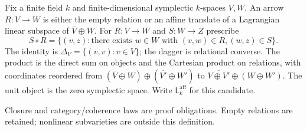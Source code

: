 \begin{definition}
Fix a finite field $k$ and finite-dimensional symplectic $k$-spaces $V,W$.
An arrow $R:V\to W$ is either the empty relation or an affine translate
of a Lagrangian linear subspace of $\overline V\oplus W$.
For $R:V\to W$ and $S:W\to Z$ prescribe
\[
 S\circ R=\{(v,z):\text{there exists }w\in W\text{ with }(v,w)\in R,
 (w,z)\in S\}.
\]
The identity is $\Delta_V=\{(v,v):v\in V\}$; the dagger is relational
converse. The product is the direct sum on objects and the Cartesian
product on relations, with coordinates reordered from
$(\overline V\oplus W)\oplus(\overline {V'}\oplus W')$ to
$\overline{V\oplus V'}\oplus(W\oplus W')$. The unit object is the zero
symplectic space. Write $\mathsf L_k^{\mathrm{aff}}$ for this candidate.
\end{definition}
\begin{scope}
Closure and category/coherence laws are proof obligations. Empty relations are retained; nonlinear subvarieties are outside this definition.
\end{scope}

